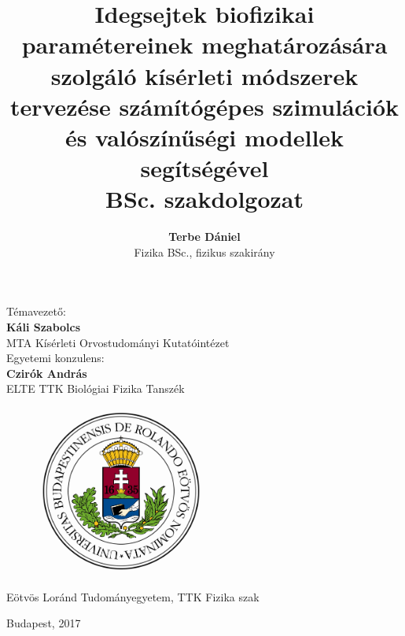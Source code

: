



\author{\textbf{Terbe Dániel} \\ Fizika BSc., fizikus szakirány }

\title{\large \textbf{Idegsejtek biofizikai paramétereinek meghatározására szolgáló kísérleti módszerek tervezése számítógépes szimulációk és valószínűségi modellek segítségével} \vspace{0.5cm} \\ BSc. szakdolgozat}
\date{}
\frenchspacing



	\clearpage
\maketitle
\thispagestyle{empty}

\begin{center}
	\large Témavezető:\\
	\textbf{\Large Káli Szabolcs}\\
	\large MTA Kísérleti Orvostudományi Kutatóintézet\\
	\vspace{1cm}
	Egyetemi konzulens:\\
	\textbf{Czirók András}\\
	ELTE TTK Biológiai Fizika Tanszék\\
\end{center}


\begin{figure}[!htb]
	\centering
	\includegraphics[width=0.5\textwidth]{./cimer.jpg}
\end{figure}
\begin{center}
	Eötvös Loránd Tudományegyetem, TTK Fizika szak 
\end{center}

\begin{center}
	\Large Budapest, 2017
\end{center}

